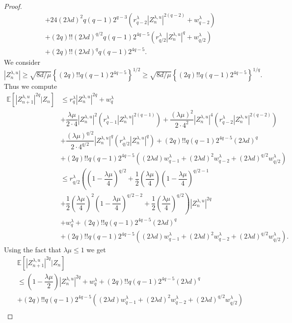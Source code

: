 \documentclass[a4paper, 10pt]{article}
\theoremstyle{plain}%
\begin{document}
\begin{proof}
\begin{align}
&+24(2\lambda d)^2q(q-1)2^{q-3} \left(r_{q-2}^{\lambda}|Z_n^{\lambda,u}|^{2(q-2)}+w_{q-2}^{\lambda}\right)\nonumber\\
&+(2q)!!(2\lambda d)^{q/2}q(q-1)2^{4q-5}\left(r^{\lambda}_{q/2}|Z_n^{\lambda,u}|^q+w^{\lambda}_{q/2}\right)\nonumber\\
&+(2q)!!(2\lambda d)^qq(q-1)2^{4q-5}.\label{eq:A7}
\end{align}
We consider $|Z_n^{\lambda,u}|\geq \sqrt{8d/\mu}\left\{(2q)!!q(q-1)2^{4q-5}\right\}^{1/2}\geq \sqrt{8d/\mu}\left\{(2q)!!q(q-1)2^{4q-5}\right\}^{1/q}.$ Thus we compute
\begin{align*}
\mathbb{E}\left[|Z_{n+1}^{\lambda,u}|^{2q}|Z_n\right]&\leq r_q^{\lambda}|Z_n^{\lambda,u}|^{2q}+w_q^{\lambda}\\
&+\dfrac{\lambda\mu}{2\cdot 4}|Z_n^{\lambda,u}|^2\left(r_{q-1}^{\lambda}|Z_n^{\lambda,u}|^{2(q-1)}\right)+\dfrac{(\lambda\mu)^2}{2\cdot 4^2}|Z_n^{\lambda,u}|^4\left(r_{q-2}^{\lambda}|Z_n^{\lambda,u}|^{2(q-2)}\right)\\&+\dfrac{(\lambda\mu)^{q/2}}{2\cdot 4^{q/2}}|Z_n^{\lambda,u}|^{q}\left(r^{\lambda}_{q/2}|Z_n^{\lambda,u}|^q\right)+(2q)!!q(q-1)2^{4q-5}(2\lambda d)^q\\&+(2q)!!q(q-1)2^{4q-5}\left((2\lambda d)w_{q-1}^{\lambda}+(2\lambda d)^2w_{q-2}^{\lambda}+(2\lambda d)^{q/2}w_{q/2}^{\lambda}\right)\\
&\leq r^{\lambda}_{q/2}\left(\left(1-\dfrac{\lambda\mu}{4}\right)^{q/2}+\dfrac{1}{2}\left(\dfrac{\lambda\mu}{4}\right)\left(1-\dfrac{\lambda\mu}{4}\right)^{q/2-1}\right.\\
&\left.+\dfrac{1}{2}\left(\dfrac{\lambda\mu}{4}\right)^{2}\left(1-\dfrac{\lambda\mu}{4}\right)^{q/2-2}+\dfrac{1}{2}\left(\dfrac{\lambda\mu}{4}\right)^{q/2}\right)|Z_n^{\lambda,u}|^{2q}\\
&+w_q^{\lambda}+(2q)!!q(q-1)2^{4q-5}(2\lambda d)^q\\
&+(2q)!!q(q-1)2^{4q-5}\left((2\lambda d)w_{q-1}^{\lambda}+(2\lambda d)^2w_{q-2}^{\lambda}+(2\lambda d)^{q/2}w_{q/2}^{\lambda}\right).
\end{align*}
Using the fact that $\lambda\mu\leq 1$ we get
\begin{align*}
&\mathbb{E}\left[|Z_{n+1}^{\lambda,u}|^{2q}|Z_n\right]\\&\leq \left(1-\dfrac{\lambda\mu}{2}\right)|Z_n^{\lambda,u}|^{2q}+w_q^{\lambda}+(2q)!!q(q-1)2^{4q-5}(2\lambda d)^q\\
&+(2q)!!q(q-1)2^{4q-5}\left((2\lambda d)w_{q-1}^{\lambda}+(2\lambda d)^2w_{q-2}^{\lambda}+(2\lambda d)^{q/2}w_{q/2}^{\lambda}\right)\\

\end{align*}
\end{proof}
\end{document}
